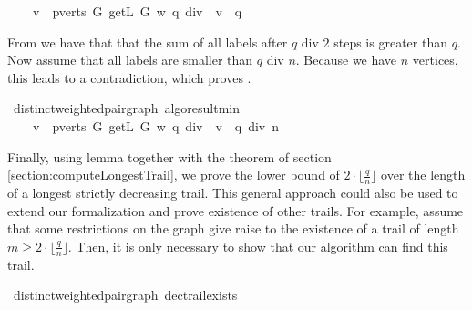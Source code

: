 \begin{isabellebody}
\ \ \ {\isachardoublequoteopen}{\isacharparenleft}{\isasymSum}\ v\ {\isasymin}\ pverts\ G{\isachardot}\ getL\ G\ w\ {\isacharparenleft}q\ div\ {}{\isacharparenright}\ v{\isacharparenright}\ {\isasymge}\ q{\isachardoublequoteclose}%
\isadelimproof
%
\endisadelimproof
%
\isatagproof
%
\endisatagproof
{\isafoldproof}%
%
\isadelimproof
%
\endisadelimproof
%
\isadelimproof
%
\endisadelimproof
%
\isatagproof
%
\endisatagproof
{\isafoldproof}%
%
\isadelimproof
%
\endisadelimproof
%
\begin{isamarkuptext}%
From  we have that that the sum of all labels after $q$ div $2$ steps is 
greater than $q$. Now assume that all labels are smaller than $q$ div $n$. Because we have $n$ vertices, this
leads to a contradiction, which proves .%
\end{isamarkuptext}\isamarkuptrue%
\isamarkupfalse%
{\isacharparenleft}\ distinct{\isacharunderscore}weighted{\isacharunderscore}pair{\isacharunderscore}graph{\isacharparenright}\ algo{\isacharunderscore}result{\isacharunderscore}min{\isacharcolon}\ \isanewline
\ \ \ {\isachardoublequoteopen}{\isacharparenleft}{\isasymexists}\ v\ {\isasymin}\ pverts\ G{\isachardot}\ getL\ G\ w\ {\isacharparenleft}q\ div\ {}{\isacharparenright}\ v\ {\isasymge}\ q\ div\ n{\isacharparenright}{\isachardoublequoteclose}%
\isadelimproof
%
\endisadelimproof
%
\isatagproof
%
\endisatagproof
{\isafoldproof}%
%
\isadelimproof
%
\endisadelimproof
%
\begin{isamarkuptext}%
Finally, using lemma  together with the  theorem 
of section \ref{section:computeLongestTrail}, we prove the lower bound of $2\cdot\lfloor \frac{q}{n} \rfloor$ over the length 
of a longest strictly decreasing trail. This general approach could also be used to extend our
formalization and prove existence of other trails. For example, assume that some restrictions on the graph 
give raise to the existence of a trail of length $m \ge 2\cdot\lfloor \frac{q}{n} \rfloor$. Then, it is
only necessary to show that our algorithm can find this trail.%
\end{isamarkuptext}\isamarkuptrue%
\isamarkupfalse%
{\isacharparenleft}\ distinct{\isacharunderscore}weighted{\isacharunderscore}pair{\isacharunderscore}graph{\isacharparenright}\ dec{\isacharunderscore}trail{\isacharunderscore}exists{\isacharcolon}\ \isanewline

\end{isabellebody}
